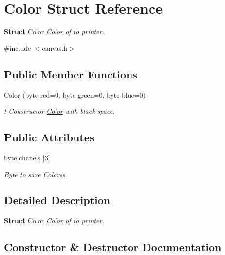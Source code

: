 \hypertarget{structColor}{}\section{Color Struct Reference}
\label{structColor}


{\bfseries Struct} \hyperlink{structColor}{Color} {\itshape  \hyperlink{structColor}{Color} of to printer.}  




{\ttfamily \#include $<$canvas.\+h$>$}

\subsection*{Public Member Functions}
\begin{DoxyCompactItemize}
\item 
\hyperlink{structColor_aa67eb05b5209dd20c279245f3043583b}{Color} (\hyperlink{canvas_8h_a0c8186d9b9b7880309c27230bbb5e69d}{byte} red=0, \hyperlink{canvas_8h_a0c8186d9b9b7880309c27230bbb5e69d}{byte} green=0, \hyperlink{canvas_8h_a0c8186d9b9b7880309c27230bbb5e69d}{byte} blue=0)
\begin{DoxyCompactList}\small\item\em ! Constructor \hyperlink{structColor}{Color} with black space. \end{DoxyCompactList}\end{DoxyCompactItemize}
\subsection*{Public Attributes}
\begin{DoxyCompactItemize}
\item 
\hyperlink{canvas_8h_a0c8186d9b9b7880309c27230bbb5e69d}{byte} \hyperlink{structColor_ada1526285d388ff4b13e1af8d7e3ad44}{chanels} \mbox{[}3\mbox{]}
\begin{DoxyCompactList}\small\item\em Byte to save Colorss. \end{DoxyCompactList}\end{DoxyCompactItemize}


\subsection{Detailed Description}
{\bfseries Struct} \hyperlink{structColor}{Color} {\itshape  \hyperlink{structColor}{Color} of to printer.} 

\subsection{Constructor \& Destructor Documentation}
\mbox{\label{structColor_aa67eb05b5209dd20c279245f3043583b}} 
